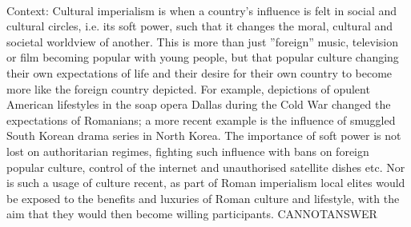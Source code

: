 \documentclass[11pt,a4paper, onecolumn]{article}
\begin{document}
\\ Context: Cultural imperialism is when a country's influence is felt in social and cultural circles, i.e. its soft power, such that it changes the moral, cultural and societal worldview of another. This is more than just ''foreign'' music, television or film becoming popular with young people, but that popular culture changing their own expectations of life and their desire for their own country to become more like the foreign country depicted. For example, depictions of opulent American lifestyles in the soap opera Dallas during the Cold War changed the expectations of Romanians; a more recent example is the influence of smuggled South Korean drama series in North Korea. The importance of soft power is not lost on authoritarian regimes, fighting such influence with bans on foreign popular culture, control of the internet and unauthorised satellite dishes etc. Nor is such a usage of culture recent, as part of Roman imperialism local elites would be exposed to the benefits and luxuries of Roman culture and lifestyle, with the aim that they would then become willing participants. CANNOTANSWER
\end{document}
